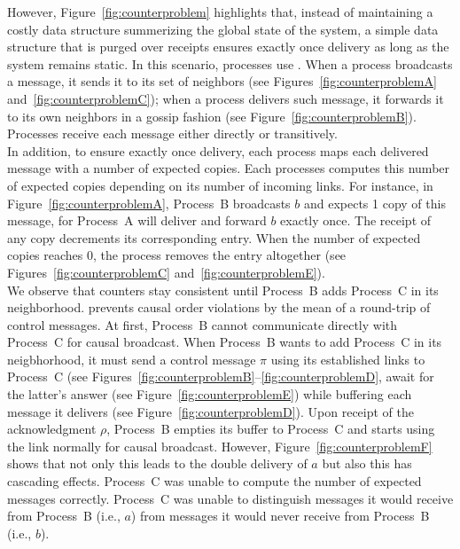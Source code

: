 However, Figure~\ref{fig:counterproblem} highlights that, instead of maintaining
a costly data structure summerizing the global state of the system, a simple
data structure that is purged over receipts ensures exactly once delivery as
long as the system remains static. In this scenario, processes use
\PCBROADCAST. When a process broadcasts a message, it sends it to its set of
neighbors (see Figures~\ref{fig:counterproblemA} and~\ref{fig:counterproblemC});
when a process delivers such message, it forwards it to its own neighbors in a
gossip fashion (see Figure~\ref{fig:counterproblemB}). Processes receive each
message either
directly or transitively.\\
In addition, to ensure exactly once delivery, each process maps each delivered
message with a number of expected copies. Each processes computes this number of
expected copies depending on its number of incoming links. For instance, in
Figure~\ref{fig:counterproblemA}, Process~B broadcasts $b$ and expects 1 copy of
this message, for Process~A will deliver and forward $b$ exactly once. The
receipt of any copy decrements its corresponding entry.  When the number of
expected copies reaches 0, the process removes the entry altogether (see
Figures~\ref{fig:counterproblemC} and~\ref{fig:counterproblemE}).\\ We observe
that counters stay consistent until Process~B adds Process~C in its
neighborhood. \PCBROADCAST prevents causal order violations by the mean of a
round-trip of control messages.  At first, Process~B cannot communicate directly
with Process~C for causal broadcast. When Process~B wants to add Process~C in
its neigbhorhood, it must send a control message $\pi$ using its established
links to Process~C (see
Figures~\ref{fig:counterproblemB}--\ref{fig:counterproblemD}, await for the
latter's answer (see Figure~\ref{fig:counterproblemE}) while buffering each
message it delivers (see Figure~\ref{fig:counterproblemD}). Upon receipt of the
acknowledgment $\rho$, Process~B empties its buffer to Process~C and starts
using the link normally for causal broadcast. However,
Figure~\ref{fig:counterproblemF} shows that not only this leads to the double
delivery of $a$ but also this has cascading effects. Process~C was unable to
compute the number of expected messages correctly. Process~C was unable to
distinguish messages it would receive from Process~B (i.e., $a$) from messages
it would never receive from Process~B (i.e., $b$).

